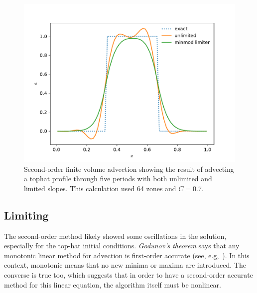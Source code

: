 \begin{figure}
\centering
\includegraphics[width=0.8\linewidth]{fv-advect}
\caption[Second-order finite-volume advection]
{\label{fig:fvadvect} Second-order finite volume advection showing the
result of advecting a tophat profile through five periods with both
unlimited and limited slopes.  This calculation used 64 zones and
$C=0.7$. \\ 
}
\end{figure}

\subsection{Limiting}

The second-order method likely showed some oscillations in the
solution, especially for the top-hat initial conditions.  {\em
  Godunov's theorem} says that any monotonic linear method for
advection is first-order accurate (see, e.g,~\cite{laney}).  In this
context, monotonic means that no new minima or maxima are introduced.
The converse is true too, which suggests that in order to have a
second-order accurate method for this linear equation, the algorithm
itself must be nonlinear.

